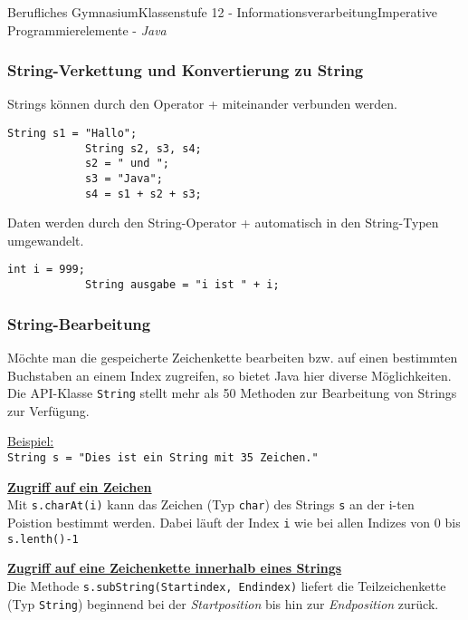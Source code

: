 \documentclass[oneside,openany,headings=optiontotoc,11pt,numbers=noenddot]{article}
\begin{document}
\begin{worksheet}{Berufliches Gymnasium}{Klassenstufe 12 - Informationsverarbeitung}{Imperative Programmierelemente - \textit{Java}}
		\subsubsection{String-Verkettung und Konvertierung zu String}
		Strings können durch den Operator \grqq{}+\grqq{} miteinander verbunden werden.
		\begin{lstlisting}[style=JavaInputStyle]
			String s1 = "Hallo";
			String s2, s3, s4;
			s2 = " und ";
			s3 = "Java";
			s4 = s1 + s2 + s3;
		\end{lstlisting}
		Daten werden durch den String-Operator \grqq{}+\grqq{} automatisch in den String-Typen umgewandelt.
		\begin{lstlisting}[style=JavaInputStyle]
			int i = 999;
			String ausgabe = "i ist " + i;
		\end{lstlisting}
		\subsubsection{String-Bearbeitung}
		Möchte man die gespeicherte Zeichenkette bearbeiten bzw. auf einen bestimmten Buchstaben an einem Index zugreifen, so bietet Java hier diverse Möglichkeiten. Die API-Klasse \lstinline[style=JavaInputStyle]|String| stellt mehr als 50 Methoden zur Bearbeitung von Strings zur Verfügung.\\
		\par\noindent
		\underline{Beispiel:}\\
		\lstinline[style=JavaInputStyle]|String s = "Dies ist ein String mit 35 Zeichen."|\\
		\par\noindent
		\textbf{\underline{Zugriff auf ein Zeichen}}\\
		Mit \lstinline[style=JavaInputStyle]|s.charAt(i)| kann das Zeichen (Typ \lstinline[style=JavaInputStyle]|char|) des Strings \lstinline[style=JavaInputStyle]|s| an der i-ten Poistion bestimmt werden. Dabei läuft der Index \lstinline[style=JavaInputStyle]|i| wie bei allen Indizes von 0 bis \lstinline[style=JavaInputStyle]|s.lenth()-1|\\
		\par\noindent
		\textbf{\underline{Zugriff auf eine Zeichenkette innerhalb eines Strings}}\\
		Die Methode \lstinline[style=JavaInputStyle]|s.subString(Startindex, Endindex)| liefert die Teilzeichenkette (Typ \lstinline[style=JavaInputStyle]|String|) beginnend bei der \textit{Startposition} bis hin zur \textit{Endposition} zurück.\\
		\par\noindent

\end{worksheet}
\end{document}
